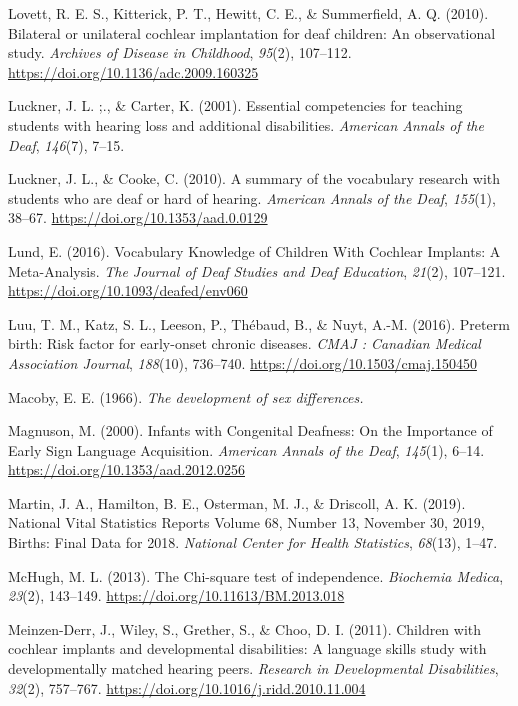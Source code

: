 \documentclass[english,man]{apa6}
\begin{document}
\leavevmode\hypertarget{ref-lovett2010}{}%
Lovett, R. E. S., Kitterick, P. T., Hewitt, C. E., \& Summerfield, A. Q. (2010). Bilateral or unilateral cochlear implantation for deaf children: An observational study. \emph{Archives of Disease in Childhood}, \emph{95}(2), 107--112. \url{https://doi.org/10.1136/adc.2009.160325}

\leavevmode\hypertarget{ref-luckner2001}{}%
Luckner, J. L. ;., \& Carter, K. (2001). Essential competencies for teaching students with hearing loss and additional disabilities. \emph{American Annals of the Deaf}, \emph{146}(7), 7--15.

\leavevmode\hypertarget{ref-luckner2010}{}%
Luckner, J. L., \& Cooke, C. (2010). A summary of the vocabulary research with students who are deaf or hard of hearing. \emph{American Annals of the Deaf}, \emph{155}(1), 38--67. \url{https://doi.org/10.1353/aad.0.0129}

\leavevmode\hypertarget{ref-lund2016}{}%
Lund, E. (2016). Vocabulary Knowledge of Children With Cochlear Implants: A Meta-Analysis. \emph{The Journal of Deaf Studies and Deaf Education}, \emph{21}(2), 107--121. \url{https://doi.org/10.1093/deafed/env060}

\leavevmode\hypertarget{ref-luu2016}{}%
Luu, T. M., Katz, S. L., Leeson, P., Thébaud, B., \& Nuyt, A.-M. (2016). Preterm birth: Risk factor for early-onset chronic diseases. \emph{CMAJ : Canadian Medical Association Journal}, \emph{188}(10), 736--740. \url{https://doi.org/10.1503/cmaj.150450}

\leavevmode\hypertarget{ref-macoby1966}{}%
Macoby, E. E. (1966). \emph{The development of sex differences.}

\leavevmode\hypertarget{ref-magnuson2000}{}%
Magnuson, M. (2000). Infants with Congenital Deafness: On the Importance of Early Sign Language Acquisition. \emph{American Annals of the Deaf}, \emph{145}(1), 6--14. \url{https://doi.org/10.1353/aad.2012.0256}

\leavevmode\hypertarget{ref-martin2019}{}%
Martin, J. A., Hamilton, B. E., Osterman, M. J., \& Driscoll, A. K. (2019). National Vital Statistics Reports Volume 68, Number 13, November 30, 2019, Births: Final Data for 2018. \emph{National Center for Health Statistics}, \emph{68}(13), 1--47.

\leavevmode\hypertarget{ref-mchugh2013}{}%
McHugh, M. L. (2013). The Chi-square test of independence. \emph{Biochemia Medica}, \emph{23}(2), 143--149. \url{https://doi.org/10.11613/BM.2013.018}

\leavevmode\hypertarget{ref-meinzen-derr2011}{}%
Meinzen-Derr, J., Wiley, S., Grether, S., \& Choo, D. I. (2011). Children with cochlear implants and developmental disabilities: A language skills study with developmentally matched hearing peers. \emph{Research in Developmental Disabilities}, \emph{32}(2), 757--767. \url{https://doi.org/10.1016/j.ridd.2010.11.004}
\end{document}
